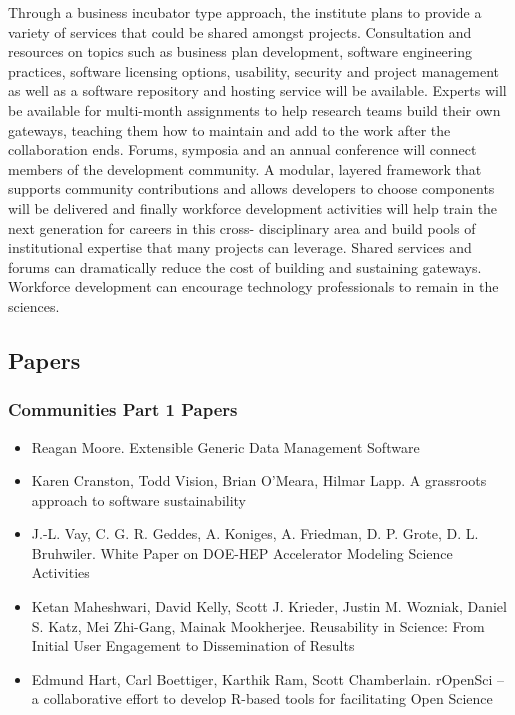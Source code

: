 \documentclass[11pt, oneside]{amsart}
\begin{document}
Through a business incubator type approach, the institute plans to provide a
variety of services that could be shared amongst projects. Consultation and
resources on topics such as business plan development, software engineering
practices, software licensing options, usability, security and project
management as well as a software repository and hosting service will be
available. Experts will be available for multi-month assignments to help
research teams build their own gateways, teaching them how to maintain and add
to the work after the collaboration ends. Forums, symposia and an annual
conference will connect members of the development community. A modular,
layered framework that supports community contributions and allows developers
to choose components will be delivered and finally workforce development
activities will help train the next generation for careers in this cross-
disciplinary area and build pools of institutional expertise that many projects
can leverage. Shared services and forums can dramatically reduce the cost of
building and sustaining gateways. Workforce development can encourage
technology professionals to remain in the sciences.


\subsection*{Papers}

\subsubsection*{Communities Part 1 Papers}

\begin{itemize}

\item Reagan Moore. Extensible Generic Data Management Software
  \cite{Moore_WSSSPE}

\item Karen Cranston, Todd Vision, Brian O'Meara, Hilmar Lapp. A
  grassroots approach to software sustainability
  \cite{Cranston_WSSSPE}

\item J.-L. Vay, C. G. R. Geddes, A. Koniges, A. Friedman,
  D. P. Grote, D. L. Bruhwiler. White Paper on DOE-HEP Accelerator
  Modeling Science Activities \cite{Vay_WSSSPE}

\item Ketan Maheshwari, David Kelly, Scott J. Krieder, Justin M. Wozniak, Daniel S. Katz, Mei Zhi-Gang, Mainak Mookherjee. Reusability in Science: From Initial User Engagement to Dissemination of Results \cite{Maheshwari_WSSSPE}

\item Edmund Hart, Carl Boettiger, Karthik Ram, Scott Chamberlain. rOpenSci -- a collaborative effort to develop R-based tools for facilitating Open Science \cite{Hart_WSSSPE}

\end{itemize}
\end{document}
